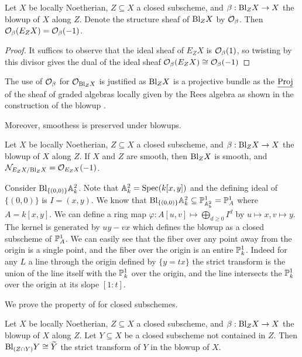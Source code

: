 \begin{proposition}\label{prop: exceptional divisor is O minus one}
    Let $X$ be locally Noetherian, $Z\subseteq X$ a closed subscheme, and $\beta:\mathrm{Bl}_{Z}X\to X$ the blowup of $X$ along $Z$. Denote the structure sheaf of $\mathrm{Bl}_{Z}X$ by $\mathcal{O}_{\beta}$. Then $\mathcal{O}_{\beta}(E_{Z}X)=\mathcal{O}_{\beta}(-1)$. 
\end{proposition}
\begin{proof}
    It suffices to observe that the ideal sheaf of $E_{Z}X$ is $\mathcal{O}_{\beta}(1)$, so twisting by this divisor gives the dual of the ideal sheaf $\mathcal{O}_{\beta}(E_{Z}X)\cong\mathcal{O}_{\beta}(-1)$
\end{proof}
\begin{remark}
    The use of $\mathcal{O}_{\beta}$ for $\mathcal{O}_{\mathrm{Bl}_{Z}X}$ is justified as $\mathrm{Bl}_{Z}X$ is a projective bundle as the $\underline{\operatorname{Proj}}$ of the sheaf of graded algebras locally given by the Rees algebra as shown in the construction of the blowup . 
\end{remark}
Moreover, smoothess is preserved under blowups. 
\begin{proposition}
    Let $X$ be locally Noetherian, $Z\subseteq X$ a closed subscheme, and $\beta:\mathrm{Bl}_{Z}X\to X$ the blowup of $X$ along $Z$. If $X$ and $Z$ are smooth, then $\mathrm{Bl}_{Z}X$ is smooth, and $\mathcal{N}_{E_{Z}X/\mathrm{Bl}_{Z}X}=\mathcal{O}_{E_{Z}X}(-1)$.
\end{proposition}
\begin{example}\label{ex: blowup of A2 at origin}
    Consider $\mathrm{Bl}_{\{(0,0)\}}\mathbb{A}^{2}_{k}$. Note that $\mathbb{A}^{2}_{k}=\operatorname{Spec}(k[x,y])$ and the defining ideal of $\{(0,0)\}$ is $I=(x,y)$. We know that $\mathrm{Bl}_{\{(0,0)\}}\mathbb{A}^{2}_{k}\subseteq\mathbb{P}^{1}_{\mathbb{A}^{2}_{k}}=\mathbb{P}^{1}_{A}$ where $A=k[x,y]$. We can define a ring map $\varphi:A[u,v]\mapsto\bigoplus_{d\geq0}I^{d}$ by $u\mapsto x,v\mapsto y$. The kernel is generated by $uy-vx$ which defines the blowup as a closed subscheme of $\mathbb{P}^{1}_{A}$. We can easily see that the fiber over any point away from the origin is a single point, and the fiber over the origin is an entire $\mathbb{P}^{1}_{k}$. Indeed for any $L$ a line through the origin defined by $\{y=tx\}$ the strict transform is the union of the line itself with the $\mathbb{P}^{1}_{k}$ over the origin, and the line intersects the $\mathbb{P}^{1}_{k}$ over the origin at its slope $[1:t]$. 
\end{example}
We prove the property of  for closed subschemes. 
\begin{lemma}\label{lem: blowup of closed subschemes}
    Let $X$ be locally Noetherian, $Z\subseteq X$ a closed subscheme, and $\beta:\mathrm{Bl}_{Z}X\to X$ the blowup of $X$ along $Z$. Let $Y\subseteq X$ be a closed subscheme not contained in $Z$. Then $\mathrm{Bl}_{(Z\cap Y)}Y\cong\widetilde{Y}$ the strict transform of $Y$ in the blowup of $X$. 
\end{lemma}
